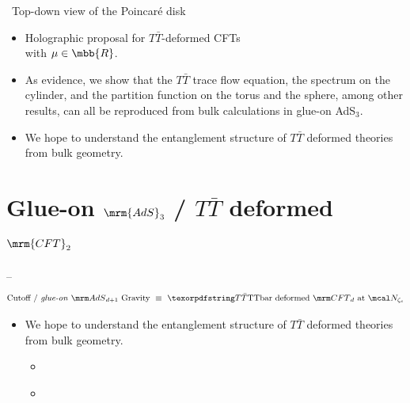 \documentclass[11pt]{article}
\renewenvironment{frame}[1]%
	{\section*{#1}}%
	{}
\newcommand{\TTbar}{\texorpdfstring{\ensuremath{T\bar{T}}}{TTbar}\xspace}
\begin{document}
\begin{multicols}{3}
\begin{center}
	\vspace{.1\baselineskip}
	\scriptsize\, Top-down view of the Poincar\'e disk
\end{center}


\begin{itemize}
\item Holographic proposal for $T\bar T$-deformed CFTs\\
with $\mu \in \mbb{R}$.

\item As evidence, we show that the $T\bar T$ trace flow equation, the spectrum on the cylinder, and the partition function on the torus and the sphere, among other results, can all be reproduced from bulk calculations in glue-on AdS$_3$.


\item We hope to understand the entanglement structure of \TTbar deformed theories from bulk geometry. 
\end{itemize}


\begin{frame}{Glue-on $\mrm{AdS}_3$ / \TTbar deformed $\mrm{CFT}_2$}{%
	\textcite{Apolo:2023vnm} -- 
}
\begin{equation*}
\stateGlueon
\end{equation*}

\begin{itemize}

\item We hope to understand the entanglement structure of \TTbar deformed theories from bulk geometry. 
	\begin{itemize}
	\item \textcite{Donnelly:2018bef,Lewkowycz:2019xse}
	\item \textcite{He:2023xnb,He:2023wko,Tian:2023fgf,Hou:2023ytl}
	\end{itemize}
\end{itemize}


\end{frame}


\renewcommand*{\bibfont}{\footnotesize}
\printbibliography %

\end{multicols}
\end{document}
